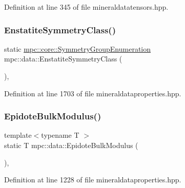 Definition at line 345 of file mineraldatatensors.\+hpp.

\mbox{\label{namespacempc_1_1data_a61795bd4708c7d51b3871220c838eafd}} 
\subsubsection{\texorpdfstring{Enstatite\+Symmetry\+Class()}{EnstatiteSymmetryClass()}}
{\footnotesize\ttfamily static \mbox{\hyperlink{namespacempc_1_1core_a9d979684062547055a0ef5c13077bad8}{mpc\+::core\+::\+Symmetry\+Group\+Enumeration}} mpc\+::data\+::\+Enstatite\+Symmetry\+Class (\begin{DoxyParamCaption}{ }\end{DoxyParamCaption})\hspace{0.3cm}{\ttfamily [inline]}, {\ttfamily [static]}}



Definition at line 1703 of file mineraldataproperties.\+hpp.

\mbox{\label{namespacempc_1_1data_a3c1c59c385d6eace137c194c69244530}} 
\subsubsection{\texorpdfstring{Epidote\+Bulk\+Modulus()}{EpidoteBulkModulus()}}
{\footnotesize\ttfamily template$<$typename T $>$ \\
static T mpc\+::data\+::\+Epidote\+Bulk\+Modulus (\begin{DoxyParamCaption}{ }\end{DoxyParamCaption})\hspace{0.3cm}{\ttfamily [inline]}, {\ttfamily [static]}}



Definition at line 1228 of file mineraldataproperties.\+hpp.

\mbox{\label{namespacempc_1_1data_a71d1ac2dc7f940dfc38c9dfef0a31ff9}} 

